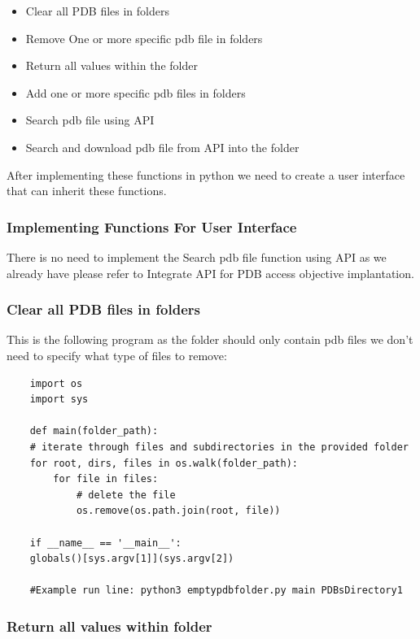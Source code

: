 \documentclass[]{final_report}
\begin{document}
\begin{itemize}
    \item Clear all PDB files in folders
    \item Remove One or more specific pdb file in folders
    \item Return all values within the folder
    \item Add one or more specific pdb files in folders
    \item Search pdb file using API
    \item Search and download pdb file from API into the folder
\end{itemize}

After implementing these functions in python we need to create a user interface that can inherit these functions.

\subsubsection{Implementing Functions For User Interface}

There is no need to implement the Search pdb file function using API as we already have please refer to Integrate API for PDB access objective implantation.

\subsubsection{Clear all PDB files in folders}

This is the following program as the folder should only contain pdb files we don't need to specify what type of files to remove:

\begin{lstlisting}
    import os
    import sys

    def main(folder_path):
    # iterate through files and subdirectories in the provided folder
    for root, dirs, files in os.walk(folder_path):
        for file in files:
            # delete the file
            os.remove(os.path.join(root, file))

    if __name__ == '__main__':
    globals()[sys.argv[1]](sys.argv[2])

    #Example run line: python3 emptypdbfolder.py main PDBsDirectory1   

\end{lstlisting}

\subsubsection{Return all values within folder}
\end{document}
